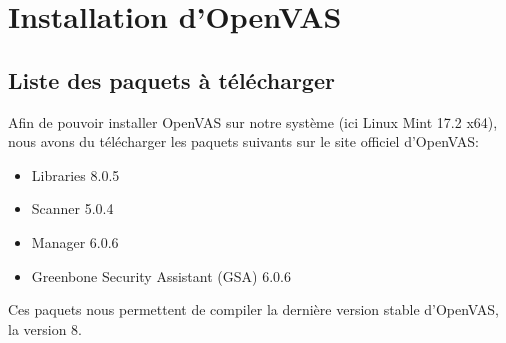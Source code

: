\section{Installation d'OpenVAS}
\subsection{Liste des paquets à télécharger}
Afin de pouvoir installer OpenVAS sur notre système (ici Linux Mint 17.2 x64), nous avons du télécharger les paquets suivants sur le site officiel d'OpenVAS\cite{OVDL}:
\begin{itemize}
 \item Libraries 8.0.5
 \item Scanner 5.0.4
 \item Manager 6.0.6
 \item Greenbone Security Assistant (GSA) 6.0.6
\end{itemize}
Ces paquets nous permettent de compiler la dernière version stable d'OpenVAS, la version 8.